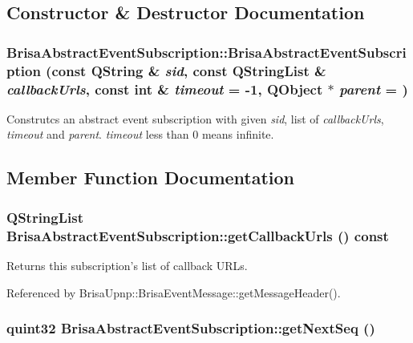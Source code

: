 \subsection{Constructor \& Destructor Documentation}
\hypertarget{classBrisaUpnp_1_1BrisaAbstractEventSubscription_a80c65fb0f14a6a1e38a89d3614bcc904}{
\subsubsection[{BrisaAbstractEventSubscription}]{\setlength{\rightskip}{0pt plus 5cm}BrisaAbstractEventSubscription::BrisaAbstractEventSubscription (const QString \& {\em sid}, \/  const QStringList \& {\em callbackUrls}, \/  const int \& {\em timeout} = {\ttfamily -\/1}, \/  QObject $\ast$ {\em parent} = {})}}
\label{classBrisaUpnp_1_1BrisaAbstractEventSubscription_a80c65fb0f14a6a1e38a89d3614bcc904}


Construtcs an abstract event subscription with given {\itshape sid\/}, list of {\itshape callbackUrls\/}, {\itshape timeout\/} and {\itshape parent\/}. {\itshape timeout\/} less than 0 means infinite. 

\subsection{Member Function Documentation}
\hypertarget{classBrisaUpnp_1_1BrisaAbstractEventSubscription_afb94634112ce0e3813e48130f46afb1d}{
\subsubsection[{getCallbackUrls}]{\setlength{\rightskip}{0pt plus 5cm}QStringList BrisaAbstractEventSubscription::getCallbackUrls () const}}
\label{classBrisaUpnp_1_1BrisaAbstractEventSubscription_afb94634112ce0e3813e48130f46afb1d}


Returns this subscription's list of callback URLs. 

Referenced by BrisaUpnp::BrisaEventMessage::getMessageHeader().\hypertarget{classBrisaUpnp_1_1BrisaAbstractEventSubscription_ad5d46adee5a94c6cd533f56b47aa9e18}{
\subsubsection[{getNextSeq}]{\setlength{\rightskip}{0pt plus 5cm}quint32 BrisaAbstractEventSubscription::getNextSeq ()}}
\label{classBrisaUpnp_1_1BrisaAbstractEventSubscription_ad5d46adee5a94c6cd533f56b47aa9e18}


